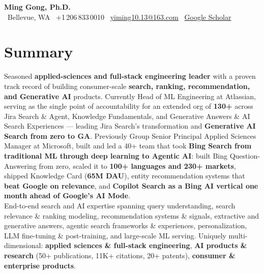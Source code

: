 \documentclass[10.5pt,letterpaper]{article}
\begin{document}
\begin{center}
  {\LARGE\bfseries\color{blue!60!black} Ming Gong, Ph.D.}\\[3pt]
  \faMapMarker* \ Bellevue, WA \quad \textbar \quad
  \faPhone \ +1\,206\,833\,0010 \quad \textbar \quad
  \faEnvelope \ \href{mailto:yiming10.13@163.com}{yiming10.13@163.com} \quad \textbar \quad
  \faGraduationCap \ \href{https://scholar.google.com/citations?user=c7JEFwsAAAAJ}{Google Scholar}
\end{center}

\section*{Summary}
Seasoned \textbf{applied-sciences and full-stack engineering leader} with a proven track record of building consumer-scale \textbf{search, ranking, recommendation, and Generative AI} products. Currently Head of ML Engineering at Atlassian, serving as the single point of accountability for an extended org of \textbf{130+} across Jira Search \& Agent, Knowledge Fundamentals, and Generative Answers \& AI Search Experiences — leading Jira Search's transformation and \textbf{Generative AI Search from zero to GA}. Previously Group Senior Principal Applied Sciences Manager at Microsoft, built and led a 40+ team that took \textbf{Bing Search from traditional ML through deep learning to Agentic AI}: built Bing Question-Answering from zero, scaled it to \textbf{100+ languages and 230+ markets}, shipped Knowledge Card (\textbf{65M DAU}), entity recommendation systems that \textbf{beat Google on relevance}, and \textbf{Copilot Search as a Bing AI vertical one month ahead of Google's AI Mode}.\\[4pt]
End-to-end search and AI expertise spanning query understanding, search relevance \& ranking modeling, recommendation systems \& signals, extractive and generative answers, agentic search frameworks \& experiences, personalization, LLM fine-tuning \& post-training, and large-scale ML serving. Uniquely multi-dimensional: \textbf{applied sciences \& full-stack engineering}, \textbf{AI products \& research} (50+ publications, 11K+ citations, 20+ patents), \textbf{consumer \& enterprise products}.

\end{document}
